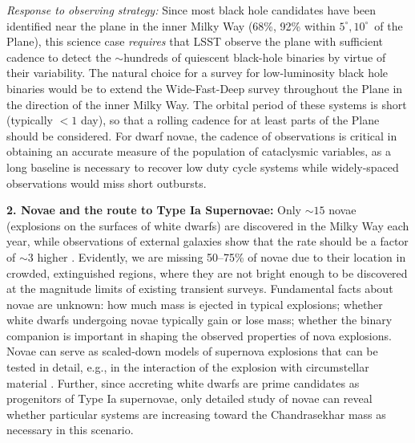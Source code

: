 {\it Response to observing strategy:} Since most black hole candidates
have been identified near the plane in the inner Milky Way (68\%, 92\%
within $5^{\circ}, 10^{\circ}$~of the Plane), this science case {\it
    requires} that LSST observe the plane with sufficient cadence to
  detect the $\sim$hundreds of quiescent black-hole binaries by virtue
  of their variability. The natural choice for a survey for
  low-luminosity black hole binaries would be to extend the
  Wide-Fast-Deep survey throughout the Plane in the direction of the
  inner Milky Way. The orbital period of these systems is short (typically $<1$ day), so that a rolling cadence
  for at least parts of the Plane should be considered. For dwarf novae, the cadence of observations
  is critical in obtaining an accurate measure of the population of
  cataclysmic variables, as a long baseline is necessary to recover
  low duty cycle systems while widely-spaced observations
 would miss short outbursts.



{\bf 2. Novae and the route to Type Ia Supernovae:} Only $\sim 15$
novae (explosions on the surfaces of white dwarfs) are discovered in
the Milky Way each year, while observations of external galaxies show
that the rate should be a factor of $\sim 3$ higher
\citep{2014ASPC..490...77S}.
Evidently, we are missing 50--75\% of novae due to their
location in crowded, extinguished regions, where they are not bright
enough to be discovered at the magnitude limits of existing transient
surveys. Fundamental facts about novae are unknown: how much mass is
ejected in typical explosions; whether white dwarfs undergoing novae
typically gain or lose mass; whether the binary companion is important
in shaping the observed properties of nova explosions. Novae can serve
as scaled-down models of supernova explosions that can be tested in
detail, e.g., in the interaction of the explosion with circumstellar
material \citep[e.g.,][]{2015arXiv151007662C}.  Further, since accreting white
dwarfs are prime candidates as progenitors of Type Ia supernovae, only
detailed study of novae can reveal whether particular systems are
increasing toward the Chandrasekhar mass as necessary in this
scenario.

